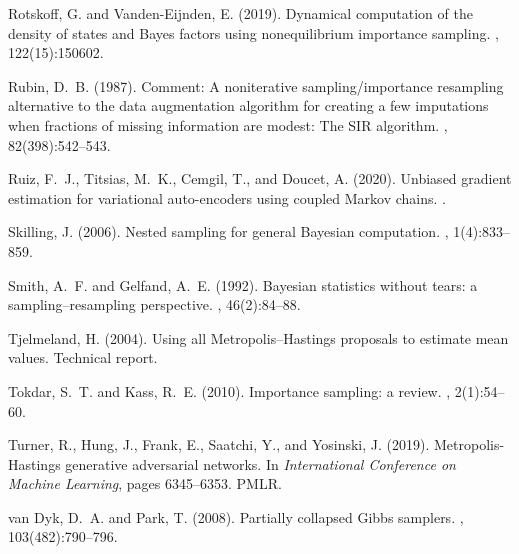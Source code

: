 \documentclass{article}
\newcommand{\1}{\mathds{1}}
\begin{document}
\begin{thebibliography}{50}
Rotskoff, G. and Vanden-Eijnden, E. (2019).
\newblock Dynamical computation of the density of states and {B}ayes factors
  using nonequilibrium importance sampling.
, 122(15):150602.

Rubin, D.~B. (1987).
\newblock Comment: A noniterative sampling/importance resampling alternative to
  the data augmentation algorithm for creating a few imputations when fractions
  of missing information are modest: The {SIR} algorithm.
,
  82(398):542--543.

Ruiz, F.~J., Titsias, M.~K., Cemgil, T., and Doucet, A. (2020).
\newblock Unbiased gradient estimation for variational auto-encoders using
  coupled {M}arkov chains.
.

Skilling, J. (2006).
\newblock Nested sampling for general {B}ayesian computation.
, 1(4):833--859.

Smith, A.~F. and Gelfand, A.~E. (1992).
\newblock Bayesian statistics without tears: a sampling--resampling
  perspective.
, 46(2):84--88.

Tjelmeland, H. (2004).
\newblock Using all {M}etropolis--{H}astings proposals to estimate mean values.
\newblock Technical report.

Tokdar, S.~T. and Kass, R.~E. (2010).
\newblock Importance sampling: a review.
,
  2(1):54--60.

Turner, R., Hung, J., Frank, E., Saatchi, Y., and Yosinski, J. (2019).
\newblock Metropolis-{H}astings generative adversarial networks.
\newblock In {\em International Conference on Machine Learning}, pages
  6345--6353. PMLR.

van Dyk, D.~A. and Park, T. (2008).
\newblock Partially collapsed {G}ibbs samplers.
,
  103(482):790--796.


\end{thebibliography}
\end{document}
